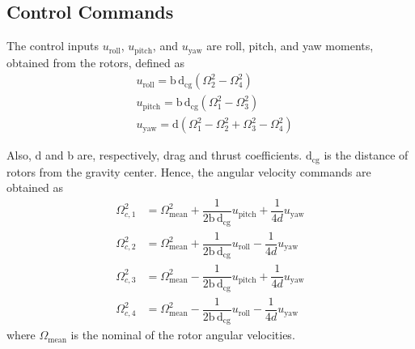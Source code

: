 \documentclass[conference]{IEEEtran}
\begin{document}
\subsection{Control Commands}
\noindent The control inputs $u_{\text{roll}}$, $u_{\text{pitch}}$, and $u_{\text{yaw}}$ are roll, pitch, and yaw moments, obtained from the rotors, defined as
\begin{align}
		&u_{\text{roll}} = \mathrm{b\,d}_{\text{cg}} (\Omega_2^2 - \Omega_4^2)\\
	&u_{\text{pitch}} = \mathrm{b\,d}_{\text{cg}} (\Omega_1^2 - \Omega_3^2) \\
	&u_{\text{yaw}} = \mathrm{d} (\Omega_1^2 - \Omega_2^2 + \Omega_3^2 - \Omega_4^2)
\end{align}

Also, d and b are, respectively, drag and thrust coefficients. $\mathrm{d}_{\text{cg}}$ is the distance of rotors from the gravity center. Hence, the angular velocity commands are obtained as
\begin{align}
		\Omega_{c, 1}^2 &= \Omega_{\text{mean}}^2 + \dfrac{1}{2\mathrm{b\,d}_{\text{cg}}}u_{\text{pitch}} + \dfrac{1}{4d}u_{\text{yaw}} \\
	\Omega_{c, 2}^2 &= \Omega_{\text{mean}}^2 + \dfrac{1}{2\mathrm{b\,d}_{\text{cg}}}u_{\text{roll}} - \dfrac{1}{4d}u_{\text{yaw}}\\
	\Omega_{c, 3}^2 &= \Omega_{\text{mean}}^2 - \dfrac{1}{2\mathrm{b\,d}_{\text{cg}}}u_{\text{pitch}} + \dfrac{1}{4d}u_{\text{yaw}} \\
\Omega_{c, 4}^2 &= \Omega_{\text{mean}}^2 - \dfrac{1}{2\mathrm{b\,d}_{\text{cg}}}u_{\text{roll}} - \dfrac{1}{4d}u_{\text{yaw}}
\end{align}
where $\Omega_{\text{mean}}$ is the nominal of the rotor angular velocities.
\end{document}
